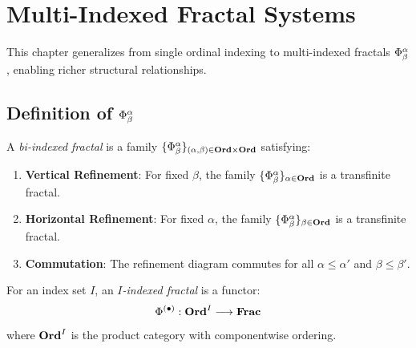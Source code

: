 
\chapter{Multi-Indexed Fractal Systems}
\label{ch:multi-indexed}

\begin{tcolorbox}[colback=blue!5!white,colframe=blue!75!black,title=\vnewfour]
This chapter generalizes from single ordinal indexing to multi-indexed fractals
$\Phi^{\alpha}_{\beta}$, enabling richer structural relationships.
\end{tcolorbox}

\section{Definition of $\Phi^{\alpha}_{\beta}$}

\begin{definition}
\label{def:multi-frac}
A \emph{bi-indexed fractal} is a family $\{\Phi^{\alpha}_{\beta}\}_{(\alpha,\beta) \in \mathbf{Ord} \times \mathbf{Ord}}$
satisfying:
\begin{enumerate}[label=(MF\arabic*)]
    \item \textbf{Vertical Refinement}: For fixed $\beta$, the family
    $\{\Phi^{\alpha}_{\beta}\}_{\alpha \in \mathbf{Ord}}$ is a transfinite fractal.

    \item \textbf{Horizontal Refinement}: For fixed $\alpha$, the family
    $\{\Phi^{\alpha}_{\beta}\}_{\beta \in \mathbf{Ord}}$ is a transfinite fractal.

    \item \textbf{Commutation}: The refinement diagram commutes for all
    $\alpha \leq \alpha'$ and $\beta \leq \beta'$.
\end{enumerate}
\end{definition}

\begin{definition}
\label{def:general-multi}
For an index set $I$, an \emph{$I$-indexed fractal} is a functor:
\[
    \Phi^{(\bullet)}: \mathbf{Ord}^I \longrightarrow \mathbf{Frac}
\]
where $\mathbf{Ord}^I$ is the product category with componentwise ordering.
\end{definition}

